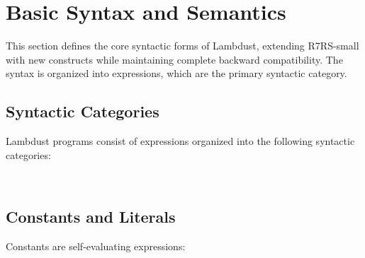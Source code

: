 \chapter{Basic Syntax and Semantics}
\label{ch:syntax}

This section defines the core syntactic forms of Lambdust, extending R7RS-small with new constructs while maintaining complete backward compatibility. The syntax is organized into expressions, which are the primary syntactic category.

\section{Syntactic Categories}
\label{sec:syntactic-categories}

Lambdust programs consist of expressions organized into the following syntactic categories:

\begin{grammar}
\\
\end{grammar}

\section{Constants and Literals}
\label{sec:constants}


Constants are self-evaluating expressions:

\begin{grammar}
\end{grammar}


